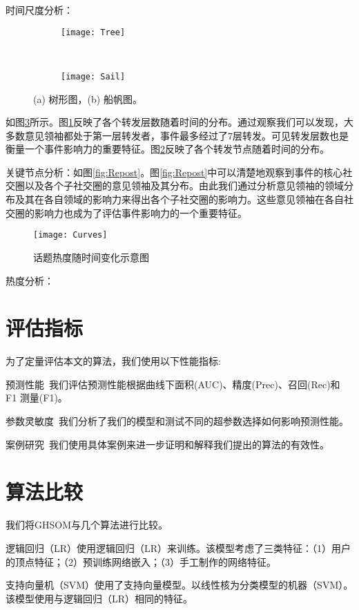 时间尺度分析：
\begin{figure}[!htbp]
    \centering
    \begin{subfigure}[b]{0.5\textwidth}
      \texttt{[image: Tree]}
      \caption{}
      \label{fig:Tree}
    \end{subfigure}%
    ~%
    \begin{subfigure}[b]{0.5\textwidth}
      \texttt{[image: Sail]}
      \caption{}
      \label{fig:Sail}
    \end{subfigure}%

    \caption{(a) 树形图，(b) 船帆图。}
    \label{fig:Time}
\end{figure}
如图\ref{fig:Time}所示。图\ref{fig:Tree}反映了各个转发层数随着时间的分布。通过观察我们可以发现，大多数意见领袖都处于第一层转发者，事件最多经过了7层转发。可见转发层数也是衡量一个事件影响力的重要特征。图\ref{fig:Sail}反映了各个转发节点随着时间的分布。



关键节点分析：如图\ref{fig:Repost}。图\ref{fig:Repost}中可以清楚地观察到事件的核心社交圈以及各个子社交圈的意见领袖及其分布。由此我们通过分析意见领袖的领域分布及其在各自领域的影响力来得出各个子社交圈的影响力。这些意见领袖在各自社交圈的影响力也成为了评估事件影响力的一个重要特征。
\begin{figure}[!htbp]
    \centering
    \texttt{[image: Curves]}
    \caption{话题热度随时间变化示意图}
    \label{fig:Curves}
\end{figure}
热度分析：




\section{评估指标}
为了定量评估本文的算法，我们使用以下性能指标:

预测性能~我们评估预测性能根据曲线下面积(AUC)、精度(Prec)、召回(Rec)和 F1 测量(F1)。

参数灵敏度~我们分析了我们的模型和测试不同的超参数选择如何影响预测性能。 

案例研究~我们使用具体案例来进一步证明和解释我们提出的算法的有效性。


\section{算法比较}

我们将GHSOM与几个算法进行比较。

逻辑回归（LR）使用逻辑回归（LR）来训练。该模型考虑了三类特征：（1）用户的顶点特征；（2）预训练网络嵌入；（3）手工制作的网络特征。

支持向量机（SVM）使用了支持向量模型。以线性核为分类模型的机器（SVM）。该模型使用与逻辑回归（LR）相同的特征。






